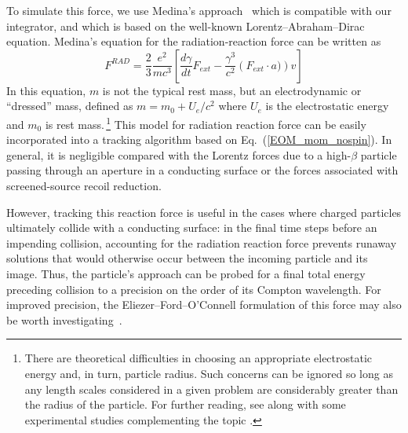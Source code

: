 \documentclass[reprint,
               amsmath,amssymb,nofootinbib, aps%
              ]{revtex4-2}
\begin{document}
To simulate this force, we use Medina's approach~\cite{medinaRadiationReactionClassical2006} which is compatible with our integrator, and which is based on the well-known Lorentz--Abraham--Dirac equation. Medina's equation for the radiation-reaction force can be written as
\begin{equation}
    F^{RAD} = \frac{2}{3}\frac{e^2}{mc^3}\left[ \frac{d\gamma}{dt}F_{ext}-\frac{\gamma^3}{c^2}\left( F_{ext}\cdot a) \right)v \right]
\end{equation}
In this equation, $m$ is not the typical rest mass, but an electrodynamic or ``dressed'' mass, defined as $m=m_0+ U_e/c^2$ where $U_e$ is the electrostatic energy and $m_0$ is rest mass.\,\footnote{There are theoretical difficulties in choosing an appropriate electrostatic energy and, in turn, particle radius. Such concerns can be ignored so long as any length scales considered in a given problem are considerably greater than the radius of the particle. For further reading, see \cite{rafelski_2022_rad_reaction, rohrlichDynamicsChargedParticle2008,martin-lunaNovelReactionForce2022,griffithsAbrahamLorentzLandau2010a,steaneReducedorderAbrahamLorentzDiracEquation2015} along with some experimental studies complementing the topic \cite{hammondRadiationReactionUltrahigh2010,liInducedCurrentDue2022,sampathExtremelyDenseGammaRay2021}.} This model for radiation reaction force can be easily incorporated into a tracking algorithm based on Eq.~(\ref{EOM_mom_nospin}). In general, it is negligible compared with the Lorentz forces due to a high-$\beta$ particle passing through an aperture in a conducting surface or the forces associated with screened-source recoil reduction.

However, tracking this reaction force is useful in the cases where charged particles ultimately collide with a conducting surface: in the final time steps before an impending collision, accounting for the radiation reaction force prevents runaway solutions that would otherwise occur between the incoming particle and its image. Thus, the particle's approach can be probed for a final total energy preceding collision to a precision on the order of its Compton wavelength. For improved precision, the Eliezer--Ford--O'Connell formulation of this force may also be worth investigating~\cite{rafelski_2022_rad_reaction}.
\end{document}
